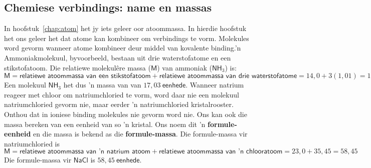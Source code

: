             \subsection*{Chemiese verbindings: name en massas}
            \nopagebreak
\label{m38689*uid97124}In hoofstuk~\ref{chap:atom} het jy iets geleer oor atoommassa. In hierdie hoofstuk het ons geleer het dat atome kan kombineer om verbindings te vorm. Molekules word gevorm wanneer atome kombineer deur middel van kovalente binding.’n Ammoniakmolekuul, byvoorbeeld, bestaan ​​uit drie waterstofatome en een stikstofatoom. Die relatiewe molekul\^{e}re massa ($\textsf{M}$) van ammoniak ($\textsf{NH}_{3}$) is:\\
\begin{equation*}
 \textsf{M} = \textsf{relatiewe atoommassa van een stikstofatoom} + \textsf{relatiewe atoommassa van drie waterstofatome}
= 14,0 + 3(1,01) 
= 17,03
\end{equation*}
Een molekuul $\textsf{NH}_{3}$ het dus  'n massa van van $17,03~\textsf{eenhede}$. Wanneer natrium reageer met chloor om natriumchloried te vorm, word daar nie een molekuul natriumchloried gevorm nie, maar eerder 'n natriumchloried kristalrooster. Onthou dat in ioniese binding molekules nie gevorm word nie. Ons kan ook die massa bereken van een eenheid van so 'n kristal. Ons noem dit 'n \textbf{formule-eenheid} en die massa is bekend as die \textbf{formule-massa}. Die formule-massa vir natriumchloried is
 \begin{equation*}
 \textsf{M} = \textsf{relatiewe atoommassa van 'n natrium atoom} + \textsf{relatiewe atoommassa van 'n chlooratoom}
= 23,0 + 35,45 
= 58,45
\end{equation*} 
Die formule-massa vir $\textsf{NaCl}$ is $58,45~\textsf{eenhede}$.
      \label{m38689*secfhsst!!!underscore!!!id822}

